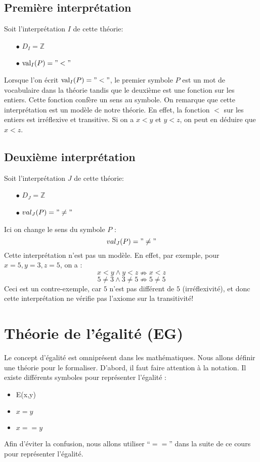 {\subsection*{Première interprétation}
Soit l'interprétation $I$ de cette théorie:
\begin{itemize}
\item[$\bullet$] $D_I = \mathbb{Z} $
\item[$\bullet$] $\mathrm{val}_I (P) = "<"$
\end{itemize}
Lorsque l'on écrit $\mathrm{val}_I(P) = "<"$, le premier symbole $P$ est un mot de vocabulaire dans la théorie
tandis que le deuxième est une fonction sur les entiers.
Cette fonction confère un sens au symbole. 
On remarque que cette interprétation est un modèle de notre théorie.
En effet, la fonction $<$ sur les entiers est irréflexive et transitive.
Si on a $x < y$ et $y <z$, on peut en déduire que $x<z$.

\subsection*{Deuxième interprétation}
Soit l'interprétation $J$ de cette théorie:
\begin{itemize}
\item[$\bullet$] $D_J = \mathbb{Z} $
\item[$\bullet$] $val_J (P) = "\ne"$
\end{itemize}
Ici on change le sens du symbole $P$ :
$$val_J(P) = "\ne"$$
Cette interprétation n'est pas un modèle. En effet, par exemple, pour $x=5, y=3, z=5$, on a :
$$x<y \wedge y<z \nRightarrow x<z$$
$$5 \neq 3 \wedge 3 \neq 5 \nRightarrow 5 \neq 5$$
Ceci est un contre-exemple, car $5$ n'est pas différent de $5$ (irréflexivité),
et donc cette interprétation ne vérifie pas l'axiome sur la transitivité!



\section{Théorie de l'égalité (EG)}

Le concept d'égalité est omniprésent dans les mathématiques.
Nous allons définir une théorie pour le formaliser.
D'abord, il faut faire attention à la notation.
Il existe différents symboles pour représenter l'égalité : 
\begin{itemize}
	\item E(x,y)
	\item $x = y$
	\item $x == y $
\end{itemize}
Afin d'éviter la confusion, nous allons utiliser ``$==$'' dans la suite de ce cours pour représenter l'égalité.

}

